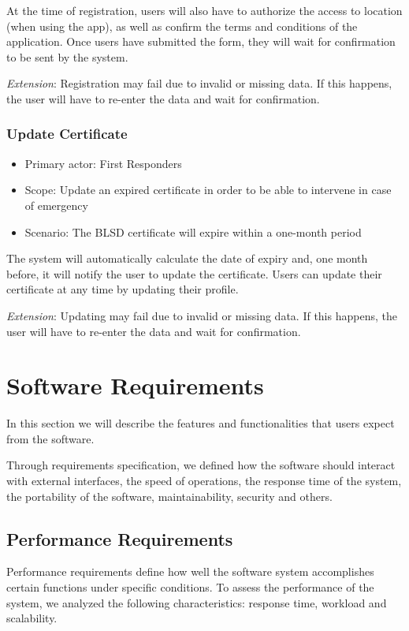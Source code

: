 \documentclass[11pt,a4paper]{article}
\begin{document}
At the time of registration, users will also have to authorize the access to location (when using the app), as well as confirm the terms and conditions of the application.
%
Once users have submitted the form, they will wait for confirmation to be sent by the system.

\textit{Extension}: Registration may fail due to invalid or missing data. If this happens, the user will have to re-enter the data and wait for confirmation.

\subsubsection*{Update Certificate}

\begin{itemize}
    \item Primary actor: First Responders
    \item Scope: Update an expired certificate in order to be able to intervene in case of emergency
    \item Scenario: The BLSD certificate will expire within a one-month period
\end{itemize}

The system will automatically calculate the date of expiry and, one month before, it will notify the user to update the certificate.
%
Users can update their certificate at any time by updating their profile.

\textit{Extension}: Updating may fail due to invalid or missing data. If this happens, the user will have to re-enter the data and wait for confirmation.

\section{Software Requirements}
In this section we will describe the features and functionalities that users expect from the software.

Through requirements specification, we defined how the software should interact with external interfaces, the speed of operations, the response time of the system, the portability of the software, maintainability, security and others.

\subsection{Performance Requirements}
Performance requirements define how well the software system accomplishes certain functions under specific conditions.
%
To assess the performance of the system, we analyzed the following characteristics: response time, workload and scalability.
\end{document}
